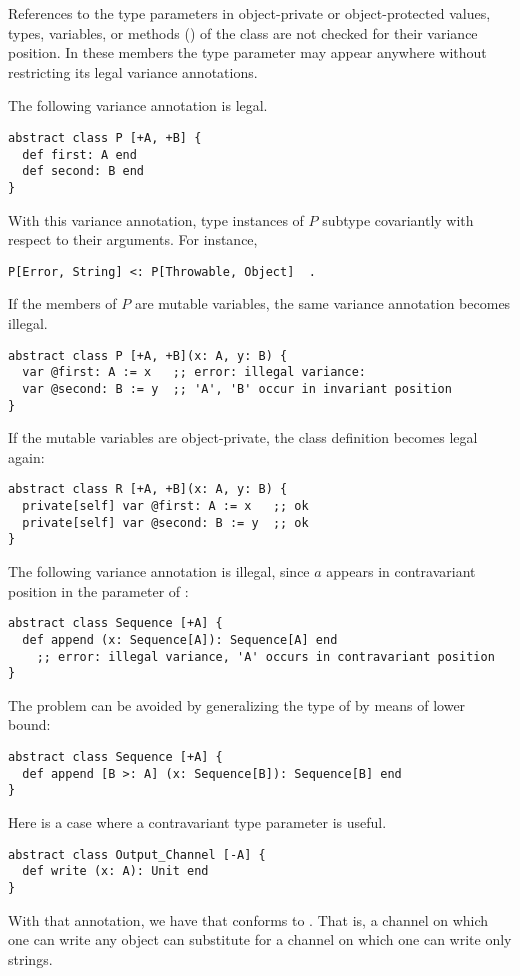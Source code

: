 References to the type parameters in object-private or object-protected values, types, variables, or methods () of the class are not checked for their variance position. In these members the type parameter may appear anywhere without restricting its legal variance annotations. 

\example The following variance annotation is legal. 
\begin{lstlisting}
abstract class P [+A, +B] {
  def first: A end
  def second: B end
}
\end{lstlisting}
With this variance annotation, type instances of $P$ subtype covariantly with respect to their arguments. For instance, 
\begin{lstlisting}
P[Error, String] <: P[Throwable, Object]  .
\end{lstlisting}
If the members of $P$ are mutable variables, the same variance annotation becomes illegal. 
\begin{lstlisting}
abstract class P [+A, +B](x: A, y: B) {
  var @first: A := x   ;; error: illegal variance:
  var @second: B := y  ;; 'A', 'B' occur in invariant position
}
\end{lstlisting}
If the mutable variables are object-private, the class definition becomes legal again: 
\begin{lstlisting}
abstract class R [+A, +B](x: A, y: B) {
  private[self] var @first: A := x   ;; ok
  private[self] var @second: B := y  ;; ok
}
\end{lstlisting}

\example The following variance annotation is illegal, since $a$ appears in contravariant position in the parameter of :
\begin{lstlisting}
abstract class Sequence [+A] {
  def append (x: Sequence[A]): Sequence[A] end
    ;; error: illegal variance, 'A' occurs in contravariant position
}
\end{lstlisting}
The problem can be avoided by generalizing the type of  by means of lower bound:
\begin{lstlisting}
abstract class Sequence [+A] {
  def append [B >: A] (x: Sequence[B]): Sequence[B] end
}
\end{lstlisting}

\example Here is a case where a contravariant type parameter is useful. 
\begin{lstlisting}
abstract class Output_Channel [-A] {
  def write (x: A): Unit end
}
\end{lstlisting}
With that annotation, we have that  conforms to . That is, a channel on which one can write any object can substitute for a channel on which one can write only strings. 
 






